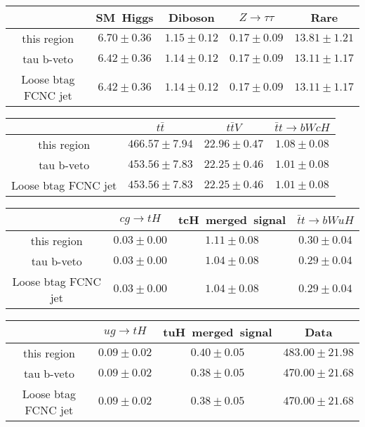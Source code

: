 \centering
\begin{tabular}{|c|c|c|c|c|} \hline
 & SM~Higgs & Diboson & $Z\to \tau\tau$ & Rare\\\hline
this region & $6.70\pm0.36$ & $1.15\pm0.12$ & $0.17\pm0.09$ & $13.81\pm1.21$\\\hline
tau b-veto & $6.42\pm0.36$ & $1.14\pm0.12$ & $0.17\pm0.09$ & $13.11\pm1.17$\\\hline
Loose btag FCNC jet & $6.42\pm0.36$ & $1.14\pm0.12$ & $0.17\pm0.09$ & $13.11\pm1.17$\\\hline
\end{tabular}
\begin{tabular}{|c|c|c|c|} \hline
 & $t\bar{t}$ & $t\bar{t}V$ & $\bar{t}t\to bWcH$\\\hline
this region & $466.57\pm7.94$ & $22.96\pm0.47$ & $1.08\pm0.08$\\\hline
tau b-veto & $453.56\pm7.83$ & $22.25\pm0.46$ & $1.01\pm0.08$\\\hline
Loose btag FCNC jet & $453.56\pm7.83$ & $22.25\pm0.46$ & $1.01\pm0.08$\\\hline
\end{tabular}
\begin{tabular}{|c|c|c|c|} \hline
 & $cg\to tH$ & tcH~merged~signal & $\bar{t}t\to bWuH$\\\hline
this region & $0.03\pm0.00$ & $1.11\pm0.08$ & $0.30\pm0.04$\\\hline
tau b-veto & $0.03\pm0.00$ & $1.04\pm0.08$ & $0.29\pm0.04$\\\hline
Loose btag FCNC jet & $0.03\pm0.00$ & $1.04\pm0.08$ & $0.29\pm0.04$\\\hline
\end{tabular}
\begin{tabular}{|c|c|c|c|} \hline
 & $ug\to tH$ & tuH~merged~signal & Data\\\hline
this region & $0.09\pm0.02$ & $0.40\pm0.05$ & $483.00\pm21.98$\\\hline
tau b-veto & $0.09\pm0.02$ & $0.38\pm0.05$ & $470.00\pm21.68$\\\hline
Loose btag FCNC jet & $0.09\pm0.02$ & $0.38\pm0.05$ & $470.00\pm21.68$\\\hline
\end{tabular}
